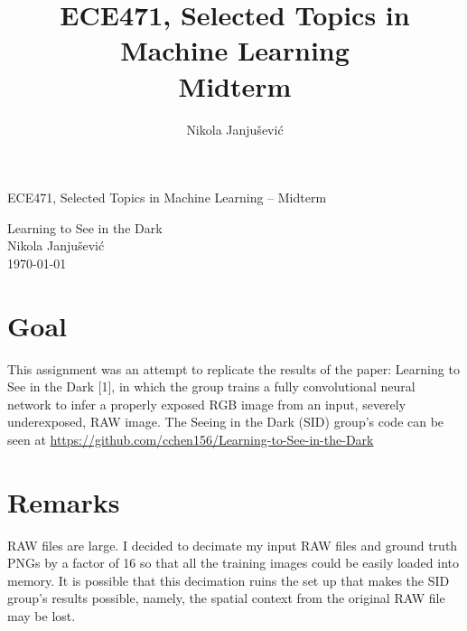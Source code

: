 \documentclass[11pt,a4paper]{article}
\author{Nikola Janju\v{s}evi\'{c}}
\title{ECE471, Selected Topics in Machine Learning \\ Midterm}
\begin{document}
\begin{large}
ECE471, Selected Topics in Machine Learning -- Midterm \\
\end{large}
Learning to See in the Dark \\
Nikola Janju\v{s}evi\'{c} \\
\today

\section*{Goal}
This assignment was an attempt to replicate the results of the paper: Learning to See in the Dark [1], in which the group trains a fully convolutional neural network to infer a properly exposed RGB image from an input, severely underexposed, RAW image. The Seeing in the Dark (SID) group's code can be seen at \url{https://github.com/cchen156/Learning-to-See-in-the-Dark}

\section*{Remarks}
RAW files are {\Large large}. I decided to decimate my input RAW files and ground truth PNGs by a factor of 16 so that all the training images could be easily loaded into memory. It is possible that this decimation ruins the set up that makes the SID group's results possible, namely, the spatial context from the original RAW file may be lost.
\end{document}
